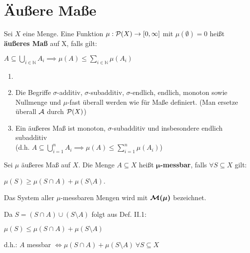 \chapter{Äußere Maße}
  \begin{definition}
    Sei $X$ eine Menge. Eine Funktion $\mu: \mathcal{P}(X) \to [0,\infty]$ mit $\mu(\emptyset)=0$ heißt \textbf{äußeres Maß} auf X, falls gilt:
    \begin{center}
      $A \subseteq \bigcup\limits_{i \in \mathbb{N}} A_i \implies \mu(A) \leq \sum\limits_{i \in \mathbb{N}} \mu(A_i)$
    \end{center}
  \end{definition}

  \begin{remark}
    \begin{enumerate}
      \item[]
      \item Die Begriffe $\sigma$-additiv, $\sigma$-subadditiv, $\sigma$-endlich, endlich, monoton sowie Nullmenge und $\mu$-fast überall werden wie für Maße definiert. (Man ersetze überall $\mathcal{A}$ durch $\mathcal{P}(X)$)
      \item Ein äußeres Maß ist monoton, $\sigma$-subadditiv und insbesondere endlich subadditiv\\
        (d.h. $A \subseteq \bigcup\limits_{i=1}^n A_i \implies \mu(A) \leq \sum\limits_{i = 1}^n \mu(A_i)$)
    \end{enumerate}
  \end{remark}

  \begin{definition}
    Sei $\mu$ äußeres Maß auf $X$. Die Menge $A \subseteq X$ heißt \textbf{$\bm{\mu}$-messbar}, falls $\forall S \subseteq X$ gilt:
    \begin{center}
      $\mu(S) \geq \mu(S \cap A) + \mu(S \setminus A)$.
    \end{center}
    Das System aller $\mu$-messbaren Mengen wird mit $\bm{\mathcal{M}(\mu)}$ bezeichnet.
  \end{definition}

  \begin{remark}
    Da $S = (S \cap A) \cup (S \setminus A)$ folgt aus Def. II.1:
    \begin{center}
      $\mu(S) \leq \mu(S \cap A) + \mu(S \setminus A)$
    \end{center}
    d.h.: $A$ messbar $\Leftrightarrow \mu(S \cap A) + \mu(S \setminus A) \ \forall S \subseteq X$ 
  \end{remark}

